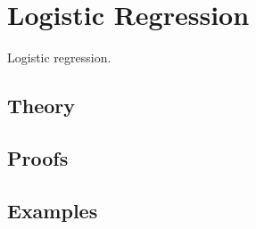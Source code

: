 
\section{Logistic Regression}
\label{sec:1.4.05-logistic-regression}

\begin{ticket}
Logistic regression.
\end{ticket}

\subsection*{Theory}

\subsection*{Proofs}

\subsection*{Examples}
